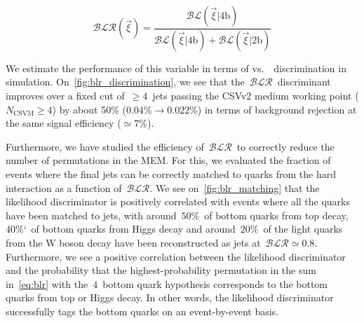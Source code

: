 \begin{equation}
\label{eq:blr_ratio}
\mathcal{BLR}(\vec{\xi}) = \frac{\mathcal{BL}(\vec{\xi} | 4\mathrm{b})}{\mathcal{BL}(\vec{\xi} | 4\mathrm{b}) + \mathcal{BL}(\vec{\xi} | 2\mathrm{b})}
\end{equation}

We estimate the performance of this variable in terms of \ttHbb vs.~\ttlf~discrimination in simulation. On~\cref{fig:blr_discrimination}, we see that the~$\mathcal{BLR}$~discriminant improves over a fixed cut of~$\ge4$~jets passing the CSVv2 medium working point ($N_{\mathrm{CSVM}} \ge 4$) by about 50\% ($0.04\% \rightarrow 0.022\%$) in terms of background rejection at the same signal efficiency ($\simeq 7\%$).

Furthermore, we have studied the efficiency of~$\mathcal{BLR}$~to correctly reduce the number of permutations in the MEM. For this, we evaluated the fraction of events where the final jets can be correctly matched to quarks from the hard interaction as a function of~$\mathcal{BLR}$. We see on~\cref{fig:blr_matching} that the likelihood discriminator is positively correlated with events where all the quarks have been matched to jets, with around~$50\%$~of bottom quarks from top decay,~$40\%$`~of bottom quarks from Higgs decay and around~$20\%$~of the light quarks from the W boson decay have been reconstructed as jets at~$\mathcal{BLR} \simeq 0.8$. Furthermore, we see a positive correlation between the likelihood discriminator and the probability that the highest-probability permutation in the sum in~\cref{eq:blr} with the~$4$~bottom quark hypothesis corresponds to the bottom quarks from top or Higgs decay. In other words, the likelihood discriminator successfully tags the bottom quarks on an event-by-event basis.

